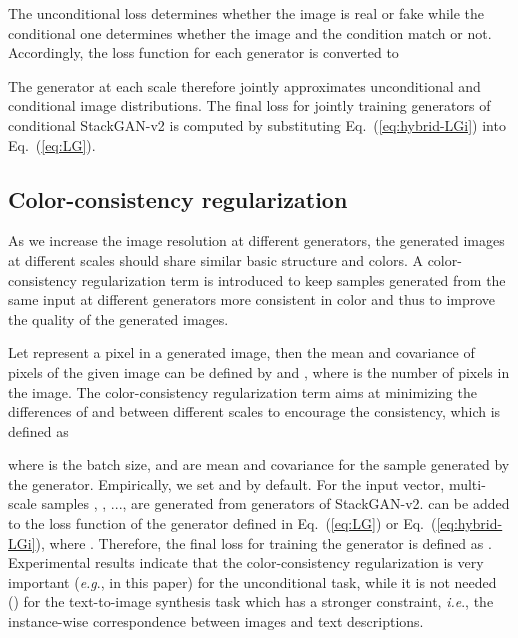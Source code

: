 \documentclass[10pt,journal,letterpaper,compsoc]{IEEEtran}
\begin{document}
The unconditional loss determines whether the image is real or fake while the conditional one determines whether the image and the condition match or not. Accordingly, the loss function for each generator  is converted to 

The generator  at each scale therefore jointly approximates unconditional and conditional image distributions. The final loss for jointly training generators of conditional StackGAN-v2 is computed by substituting Eq.~(\ref{eq:hybrid-LGi}) into Eq.~(\ref{eq:LG}). 


\subsection{Color-consistency regularization}\label{sec:color}

As we increase the image resolution at different generators, the generated images at different scales should share similar basic structure and colors. A color-consistency regularization term is introduced to keep samples generated from the same input at different generators more consistent in color and thus to improve the quality of the generated images. 


Let  represent a pixel in a generated image, then the mean and covariance of pixels of the given image can be defined by  and , where  is the number of pixels in the image. The color-consistency regularization term aims at minimizing the differences of  and  between different scales to encourage the consistency, which is defined as

where  is the batch size,  and  are mean and covariance for the  sample generated by the  generator. Empirically, we set  and  by default. For the  input vector, multi-scale samples , , ...,  are generated from  generators of StackGAN-v2.  can be added to the loss function of the  generator defined in Eq.~(\ref{eq:LG}) or Eq.~(\ref{eq:hybrid-LGi}), where . 
Therefore, the final loss for training the  generator is defined as . 
Experimental results indicate that the color-consistency regularization is very important (\emph{e.g}.,  in this paper) for the unconditional task, while it  is  not  needed () for the text-to-image synthesis task which has a stronger constraint, \emph{i.e}., the instance-wise correspondence between images and text descriptions. 
\end{document}
